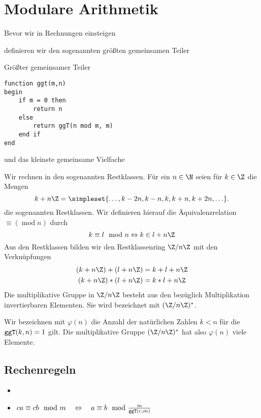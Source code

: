 \chapter{Modulare Arithmetik}
Bevor wir in Rechnungen einsteigen

definieren wir den sogenannten größten gemeinsamen Teiler


Größter gemeinsamer Teiler
\begin{lstlisting}
function ggt(m,n)
begin
	if m = 0 then 
		return n
	else 
		return ggT(n mod m, m)
	end if
end
\end{lstlisting}

und das kleinste gemeinsame Vielfache






Wir rechnen in den sogenannten Restklassen. Für ein $n\in\N$ seien für $k\in\Z$ die Mengen
\begin{equation*}
	k+n\Z=\simpleset{\ldots,k-2n,k-n,k,k+n,k+2n,\ldots}.
\end{equation*}
die sogenannten Restklassen. Wir definieren hierauf die Äquivalenzrelation $\equiv (\operatorname{mod} n)$ durch
\begin{equation*}
	k\equiv l\mod n\Leftrightarrow k\in l+n\Z
\end{equation*}
Aus den Restklassen bilden wir den Restklassenring $\Z/n\Z$ mit den Verknüpfungen
\begin{align*}
	(k+n\Z)+(l+n\Z)&=k+l+n\Z\\
	(k+n\Z)*(l+n\Z)&=k*l+n\Z\\
\end{align*}
Die multiplikative Gruppe in $\Z/n\Z$ besteht aus den bezüglich Multiplikation invertierbaren Elementen. Sie wird bezeichnet mit $(\Z/n\Z)^\ast$.

Wir bezeichnen mit $\varphi(n)$ die Anzahl der natürlichen Zahlen $k<n$ für die $\texttt{ggT}(k,n)=1$ gilt. Die multiplikative Gruppe $(\Z/n\Z)^\ast$ hat also $\varphi(n)$ viele Elemente.



\section{Rechenregeln}
\begin{itemize}
	\item 
	\item $ca\equiv cb\mod m\quad\Leftrightarrow\quad a\equiv b\mod \frac{m}{\texttt{ggT}(c,m)}$
\end{itemize}




